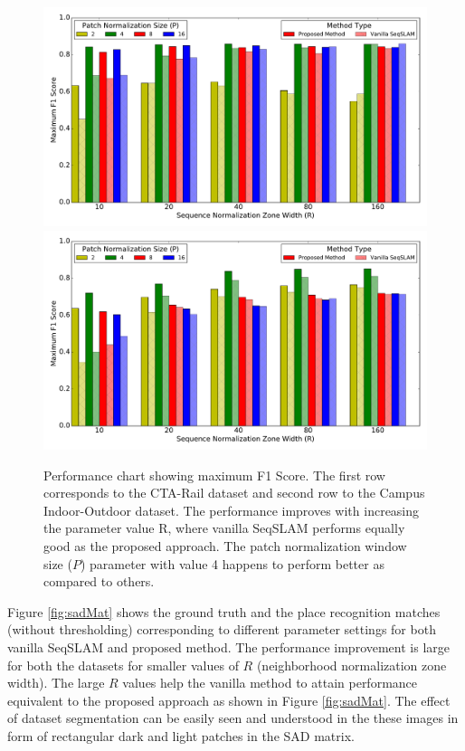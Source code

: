 \documentclass[letterpaper, 10 pt, conference]{ieeeconf}  %
\begin{document}
\begin{figure}
\centering
\includegraphics[scale=0.48]{cta-bar-graph}\\
\includegraphics[scale=0.48]{campus-io-bar-graph}
 \caption{Performance chart showing maximum F1 Score. The first row corresponds to the CTA-Rail dataset and second row to the Campus Indoor-Outdoor dataset. The performance improves with increasing the parameter value R, where vanilla SeqSLAM performs equally good as the proposed approach. The patch normalization window size ($P$) parameter with value 4 happens to perform better as compared to others.}
 \label{fig:performanceChart}
\end{figure}

Figure \ref{fig:sadMat} shows the ground truth and the place recognition matches (without thresholding) corresponding to different parameter settings for both vanilla SeqSLAM and proposed method. The performance improvement is large for both the datasets for smaller values of $R$ (neighborhood normalization zone width). The large $R$ values help the vanilla method to attain performance equivalent to the proposed approach as shown in Figure \ref{fig:sadMat}. The effect of dataset segmentation can be easily seen and understood in the these images in form of rectangular dark and light patches in the SAD matrix. 
\end{document}
